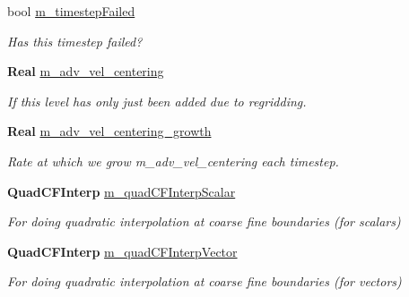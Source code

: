 \begin{DoxyCompactItemize}
\mbox{\label{class_a_m_r_level_mushy_layer_abf254beee2f05065819e03b76e824d04}} 
bool \hyperlink{class_a_m_r_level_mushy_layer_abf254beee2f05065819e03b76e824d04}{m\+\_\+timestep\+Failed}
\begin{DoxyCompactList}\small\item\em Has this timestep failed? \end{DoxyCompactList}\item 
\textbf{ Real} \hyperlink{class_a_m_r_level_mushy_layer_af41eb6058681e1345ce40633dd9fde1f}{m\+\_\+adv\+\_\+vel\+\_\+centering}
\begin{DoxyCompactList}\small\item\em If this level has only just been added due to regridding. \end{DoxyCompactList}\item 
\mbox{\label{class_a_m_r_level_mushy_layer_a532678009eb6a62cb967f6578c88fef6}} 
\textbf{ Real} \hyperlink{class_a_m_r_level_mushy_layer_a532678009eb6a62cb967f6578c88fef6}{m\+\_\+adv\+\_\+vel\+\_\+centering\+\_\+growth}
\begin{DoxyCompactList}\small\item\em Rate at which we grow m\+\_\+adv\+\_\+vel\+\_\+centering each timestep. \end{DoxyCompactList}\item 
\mbox{\label{class_a_m_r_level_mushy_layer_aef47162bc24ba3eccffb5f7319c4d19d}} 
\textbf{ Quad\+C\+F\+Interp} \hyperlink{class_a_m_r_level_mushy_layer_aef47162bc24ba3eccffb5f7319c4d19d}{m\+\_\+quad\+C\+F\+Interp\+Scalar}
\begin{DoxyCompactList}\small\item\em For doing quadratic interpolation at coarse fine boundaries (for scalars) \end{DoxyCompactList}\item 
\mbox{\label{class_a_m_r_level_mushy_layer_a95cbb370eeaed9cd89e03dbf57d69988}} 
\textbf{ Quad\+C\+F\+Interp} \hyperlink{class_a_m_r_level_mushy_layer_a95cbb370eeaed9cd89e03dbf57d69988}{m\+\_\+quad\+C\+F\+Interp\+Vector}
\begin{DoxyCompactList}\small\item\em For doing quadratic interpolation at coarse fine boundaries (for vectors) \end{DoxyCompactList}\item 

\end{DoxyCompactItemize}
